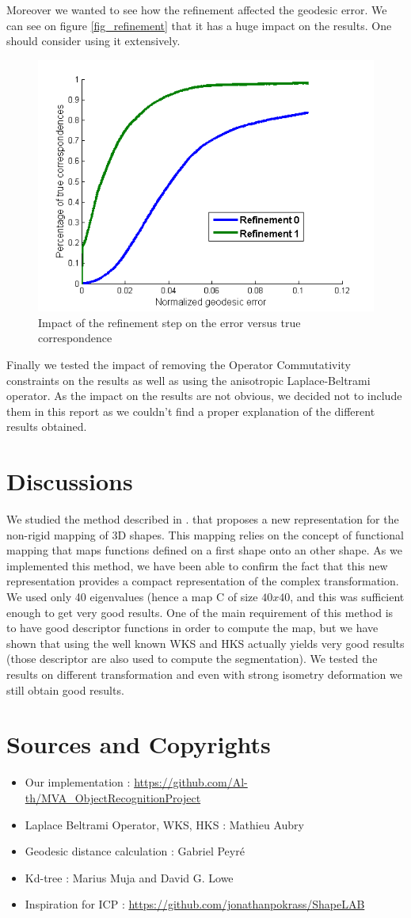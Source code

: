 \documentclass[10pt,twocolumn,letterpaper]{article}
\begin{document}
Moreover we wanted to see how the refinement affected the geodesic error. We can see on figure \ref{fig_refinement} that it has a huge impact on the results. One should consider using it extensively.

\begin{figure}[h]
\centering
\includegraphics[width=.4\textwidth]{Images/refinement.png}
\caption{Impact of the refinement step on the error versus true correspondence}
\label{refinement}
\end{figure}

Finally we tested the impact of removing the Operator Commutativity constraints on the results as well as using the anisotropic Laplace-Beltrami operator. As the impact on the results are not obvious, we decided not to include them in this report as we couldn't find a proper explanation of the different results obtained.
 

\section{Discussions} %
We studied the method described in \cite{ovs}. that proposes a new representation for the non-rigid mapping of 3D shapes. This mapping relies on the concept of functional mapping that maps functions defined on a first shape onto an other shape. As we implemented this method, we have been able to confirm the fact that this new representation provides a compact representation of the complex transformation. We used only 40 eigenvalues (hence a map C of size $40x40$, and this was sufficient enough to get very good results. One of the main requirement of this method is to have good descriptor functions in order to compute the map, but we have shown that using the well known WKS and HKS actually yields very good results (those descriptor are also used to compute the segmentation). We tested the results on different transformation and even with strong isometry deformation we still obtain good results.

\section*{Sources and Copyrights}
\begin{itemize}
\setlength\itemsep{0.01em}
\item{Our implementation : \url{https://github.com/Al-th/MVA_ObjectRecognitionProject}}
\item{Laplace Beltrami Operator, WKS, HKS : Mathieu Aubry}
\item{Geodesic distance calculation : Gabriel Peyré}
\item{Kd-tree : Marius Muja and David G. Lowe}
\item{Inspiration for ICP : \url{https://github.com/jonathanpokrass/ShapeLAB}}
\end{itemize}


{\small


}
\end{document}

